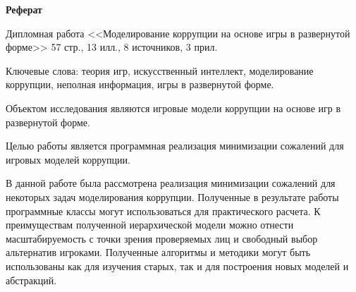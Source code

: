 \begin{center}
	{\large \textbf{Реферат}}
\end{center}
\par
Дипломная работа <<Моделирование коррупции на основе игры в развернутой форме>> 57 стр., 13 илл., 8 источников, 3 прил.
\par
Ключевые слова: теория игр, искусственный интеллект, моделирование коррупции, неполная информация, игры в развернутой форме.
\par
Объектом исследования являются игровые модели коррупции на основе игр в развернутой форме.
\par
Целью работы является программная реализация минимизации сожалений для игровых моделей коррупции.
\par
В данной работе была рассмотрена реализация минимизации сожалений для некоторых задач моделирования коррупции.
Полученные в результате работы программные классы могут использоваться для практического расчета. К преимуществам полученной иерархической модели можно отнести масштабируемость с точки зрения проверяемых лиц и свободный выбор альтернатив игроками. Полученные алгоритмы и методики могут быть использованы как для изучения старых, так и для построения новых моделей и абстракций.